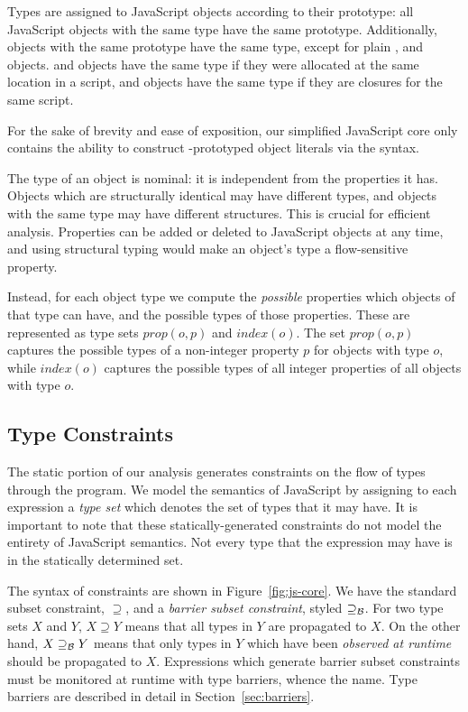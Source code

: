 Types are assigned to JavaScript objects according to their prototype:
all JavaScript objects with the same type have the same prototype.
Additionally, objects with the same prototype have the same type,
except for plain ,  and  objects.
 and  objects have the same type if they were
allocated at the same location in a script,
and  objects have the same type if they are closures
for the same script.

For the sake of brevity and ease of exposition, our simplified JavaScript core
only contains the ability to construct -prototyped object
literals via the \code{\{\}} syntax.

The type of an object is nominal: it is independent from the properties it
has. Objects which are structurally identical may have different types, and
objects with the same type may have different structures. This is crucial for
efficient analysis. Properties can be added or deleted to JavaScript objects
at any time, and using structural typing would make an object's type a
flow-sensitive property.

Instead, for each object type we compute the {\it possible} properties which
objects of that type can have, and the possible types of those properties.
These are represented as type sets $\mathit{prop}(o,p)$ and
$\mathit{index}(o)$. The set $\mathit{prop}(o,p)$ captures the possible types
of a non-integer property $p$ for objects with type $o$, while
$\mathit{index}(o)$ captures the possible types of all integer properties of
all objects with type $o$.

\subsection{Type Constraints}
\label{sec:constraints}

The static portion of our analysis generates constraints on the flow of types
through the program. We model the semantics of JavaScript by assigning to each
expression a \emph{type set} which denotes the set of types that it may
have. It is important to note that these statically-generated constraints do
not model the entirety of JavaScript semantics. Not every type that the
expression may have is in the statically determined set.

The syntax of constraints are shown in Figure~\ref{fig:js-core}. We have the
standard subset constraint, $\supseteq$, and a \emph{barrier subset
  constraint}, styled $\supseteq_\mathcal{B}$. For two type sets $X$ and $Y$, $X \supseteq
Y$ means that all types in $Y$ are propagated to $X$. On the other hand, $X
\supseteq_\mathcal{B} Y$ means that only types in $Y$ which have been \emph{observed at
runtime} should be propagated to $X$. Expressions which generate barrier
subset constraints must be monitored at runtime with type barriers, whence the
name. Type barriers are described in detail in Section~\ref{sec:barriers}.

